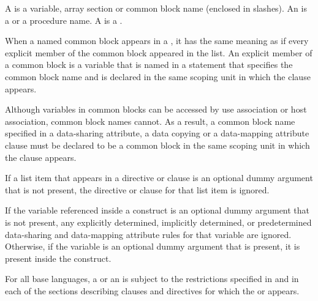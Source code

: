 \begin{fortranspecific}
A  is a variable, array section or common block name
(enclosed in slashes). An  is a 
or a procedure name. A  is a .

When a named common block appears in a , it has the same
meaning as if every explicit member of the common block appeared in
the list.  An explicit member of a common block is a variable that is
named in a  statement that specifies the common block
name and is declared in the same scoping unit in which the clause
appears.

Although variables in common blocks can be accessed by use association
or host association, common block names cannot.  As a result, a common
block name specified in a data-sharing attribute, a data copying or
a data-mapping attribute clause must be declared to be a common block in
the same scoping unit in which the clause appears.

If a list item that appears in a directive or clause is an optional
dummy argument that is not present, the directive or clause for that
list item is ignored.

If the variable referenced inside a construct is an optional dummy
argument that is not present, any explicitly determined, implicitly
determined, or predetermined data-sharing and data-mapping attribute
rules for that variable are ignored.  Otherwise, if the variable is an
optional dummy argument that is present, it is present inside the
construct.
\end{fortranspecific}

For all base languages, a   or an 
is subject to the restrictions specified in 
and in each of the sections describing clauses and directives for which
the  or  appears.



